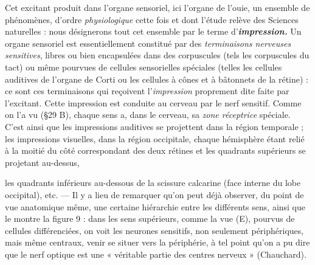 Cet excitant produit dans l’organe sensoriel, ici l'organe de l’ouie,
un ensemble de phénomènes, d’ordre {\it physiologique} cette fois et dont l’étude
relève des Sciences naturelles : nous désignerons tout cet ensemble par le terme
d'\textbf{\textit {impression.}} Un organe sensoriel est essentiellement constitué par des
{\it terminaisons nerveuses sensitives}, libres ou bien encapsulées dans des
corpuscules (tels les corpuscules du tact) ou même pourvues de cellules
sensorielles spéciales (telles les cellules auditives de l’organe de Corti ou
les cellules à cônes et à bâtonnets de la rétine) : ce sont ces terminaisons
qui reçoivent l'{\it impression} proprement dite faite par l'excitant. Cette
impression est conduite au cerveau par le nerf sensitif. Comme on l’a vu
(\S 29 B), chaque sens a, dans le cerveau, sa {\it zone réceptrice}
spéciale. C’est ainsi que les impressions auditives se projettent
dans la région temporale ; les impressions visuelles, dans la
région occipitale, chaque hémisphère étant relié à la moitié du
côté correspondant des deux rétines et les quadrants supérieurs se projetant
au-dessus,

les quadrants inférieurs au-dessous de la scissure calcarine
(face interne du lobe occipital), etc. —
Il y a lieu de remarquer qu’on peut déjà observer, du point de vue
anatomique même, une certaine hiérarchie entre les différents sens,
ainsi que le montre la figure 9 : dans les sens supérieurs, comme la
vue (E), pourvus de cellules différenciées, on voit les neurones sensitifs,
non seulement périphériques, mais même centraux, venir se situer
vers la périphérie, à tel point qu’on a pu dire que le nerf optique est
une « véritable partie des centres nerveux » (Chauchard).

